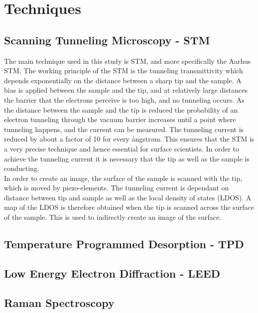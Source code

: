 \chapter{Techniques}

\section{Scanning Tunneling Microscopy - STM}

The main technique used in this study is STM, and more specifically the Aarhus STM. The working principle of the STM is the tunneling transmittivity which depends exponentially on the distance between a sharp tip and the sample. A bias is applied between the sample and the tip, and at relatively large distances the barrier that the electrons perceive is too high, and no tunneling occurs. As the distance between the sample and the tip is reduced the probability of an electron tunneling through the vacuum barrier increases until a point where tunneling happens, and the current can be measured. The tunneling current is reduced by about a factor of 10 for every ångstrøm.\cite{STMbinnig} This ensures that the STM is a very precise technique and hence essential for surface scientists. In order to achieve the tunneling current it is necessary that the tip as well as the sample is conducting.\\
In order to create an image, the surface of the sample is scanned with the tip, which is moved by piezo-elements. The tunneling current is dependant on distance between tip and sample as well as the local density of states (LDOS). A map of the LDOS is therefore obtained when the tip is scanned across the surface of the sample. This is used to indirectly create an image of the surface.\\


\section{Temperature Programmed Desorption - TPD}



\section{Low Energy Electron Diffraction - LEED}



\section{Raman Spectroscopy}
